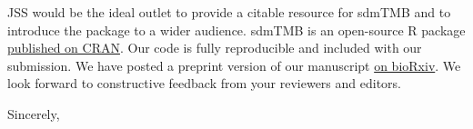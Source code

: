 \documentclass[letterpaper]{letter}
\providecommand{\pkg}[1]{{\normalfont\fontseries{b}\selectfont #1}}
\let\proglang=\textsf
\begin{document}
\begin{letter}{}

JSS would be the ideal outlet to provide a citable resource for \pkg{sdmTMB} and to introduce the package to a wider audience. \pkg{sdmTMB} is an open-source \proglang{R} package \href{https://CRAN.R-project.org/package=sdmTMB}{published on CRAN}. Our code is fully reproducible and included with our submission. We have posted a preprint version of our manuscript \href{https://doi.org/10.1101/2022.03.24.485545}{on bioRxiv}. We look forward to constructive feedback from your reviewers and editors.

\vspace{3mm}
\closing{Sincerely,\\
}

\end{letter}
\end{document}

